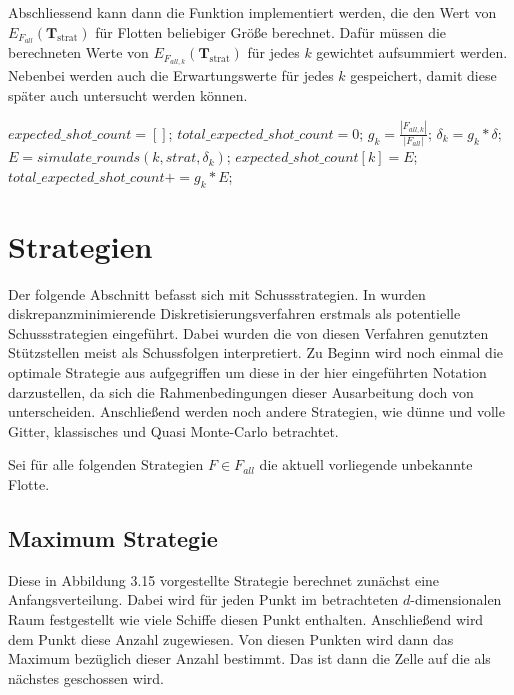 \documentclass[a4paper,12pt]{llncs}
\numberwithin{equation}{section}
\DeclareMathOperator{\strat}{strat}
\begin{document}
Abschliessend kann dann die Funktion implementiert werden, die den Wert von $E_{F_{all}}(\mathbf{T}_{\strat})$ für Flotten beliebiger Größe berechnet. Dafür müssen die berechneten Werte von $E_{F_{all,k}}(\mathbf{T}_{\strat})$ für jedes $k$ gewichtet aufsummiert werden. Nebenbei werden auch die Erwartungswerte für jedes $k$ gespeichert, damit diese später auch untersucht werden können.

\begin{tcolorbox}
\begin{algorithmic}[H]
	\State $expected\_shot\_count=[]$;
	\State $total\_expected\_shot\_count=0$;
	\State $g_k=\frac{|F_{all,k}|}{|F_{all}|}$;
	\State $\delta_k=g_k * \delta$;
	\State $E=simulate\_rounds(k, strat, \delta_k)$;
	\State $expected\_shot\_count[k] = E$;
	\State $total\_expected\_shot\_count+=g_k * E$;
	\EndFor
	\EndFunction
\end{algorithmic}
\end{tcolorbox}


\section{Strategien}

Der folgende Abschnitt befasst sich mit Schussstrategien. In \cite{M13} wurden diskrepanzminimierende Diskretisierungsverfahren erstmals als potentielle Schussstrategien eingeführt. Dabei wurden die von diesen Verfahren genutzten Stützstellen meist als Schussfolgen interpretiert. Zu Beginn wird noch einmal die optimale Strategie aus \cite{M13} aufgegriffen um diese in der hier eingeführten Notation darzustellen, da sich die Rahmenbedingungen dieser Ausarbeitung doch von \cite{M13} unterscheiden. Anschließend werden noch andere Strategien, wie dünne und volle Gitter, klassisches und Quasi Monte-Carlo betrachtet. 

Sei für alle folgenden Strategien $F\in F_{all}$ die aktuell vorliegende unbekannte Flotte.

\subsection{Maximum Strategie}

Diese in \cite{M13} Abbildung 3.15 vorgestellte Strategie berechnet zunächst eine Anfangsverteilung. Dabei wird für jeden Punkt im betrachteten $d$-dimensionalen Raum festgestellt wie viele Schiffe diesen Punkt enthalten. Anschließend wird dem Punkt diese Anzahl zugewiesen. Von diesen Punkten wird dann das Maximum bezüglich dieser Anzahl bestimmt. Das ist dann die Zelle auf die als nächstes geschossen wird.
\end{document}
